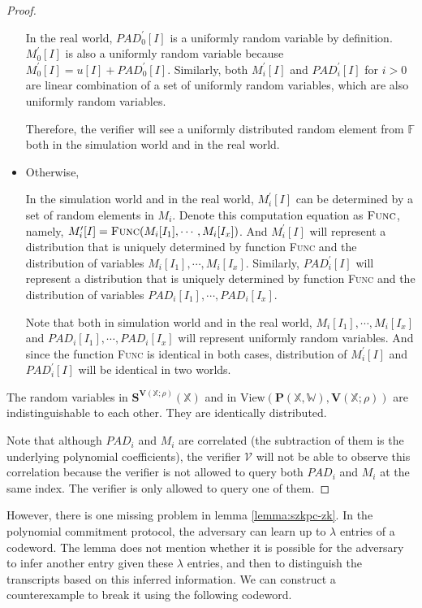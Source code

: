 \begin{proof}
\begin{itemize}
    In the real world, $PAD_0^\prime[I]$ is a uniformly random variable by definition. $M_0^\prime[I]$ is also a uniformly random variable because $M_0^\prime[I] = u[I] + PAD_0^\prime[I]$. Similarly, both $M_i^\prime[I]$ and $PAD_i^\prime[I]$ for $i > 0$ are linear combination of a set of uniformly random variables, which are also uniformly random variables.
    
    Therefore, the verifier will see a uniformly distributed random element from $\mathbb{F}$ both in the simulation world and in the real world.
    
    \item Otherwise,
    
    In the simulation world and in the real world, $M_i^\prime[I]$ can be determined by a set of random elements in $M_i$. Denote this computation equation as $\textsc{Func}$, namely, $M_i^\prime[I] = \textsc{Func}(M_i[I_1], \cdots, M_i[I_x])$. And $M_i^\prime[I]$ will represent a distribution that is uniquely determined by function \textsc{Func} and the distribution of variables $M_i[I_1], \cdots, M_i[I_x]$. Similarly, $PAD_i^\prime[I]$ will represent a distribution that is uniquely determined by function \textsc{Func} and the distribution of variables $PAD_i[I_1], \cdots, PAD_i[I_x]$.
    
    Note that both in simulation world and in the real world, $M_i[I_1], \cdots, M_i[I_x]$ and $PAD_i[I_1], \cdots, PAD_i[I_x]$ will represent uniformly random variables. And since the function \textsc{Func} is identical in both cases, distribution of $M_i^\prime[I]$ and $PAD_i^\prime[I]$ will be identical in two worlds.
    
    
\end{itemize}

The random variables in $\textbf{S}^{\textbf{V}(\mathbb{X};\rho)}(\mathbb{X})$ and in $\text{View}(\textbf{P}(\mathbb{X}, \mathbb{W}), \textbf{V}(\mathbb{X};\rho))$ are indistinguishable to each other. They are identically distributed.

Note that although $PAD_i$ and $M_i$ are correlated (the subtraction of them is the underlying polynomial coefficients), the verifier $\mathcal{V}$ will not be able to observe this correlation because the verifier is not allowed to query both $PAD_i$ and $M_i$ at the same index. The verifier is only allowed to query one of them.

\end{proof}
However, there is one missing problem in lemma \ref{lemma:szkpc-zk}. In the polynomial commitment protocol, the adversary can learn up to $\lambda$ entries of a codeword.
The lemma does not mention whether it is possible for the adversary to infer another entry given these $\lambda$ entries, and then to distinguish the transcripts based on this inferred information. We can construct a counterexample to break it using the following codeword.

